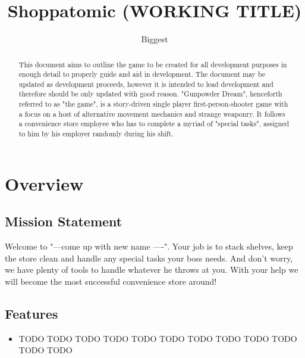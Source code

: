 \documentclass[10pt,a4paper]{article}
\author{Biggest}
\title{Shoppatomic (WORKING TITLE)}
\begin{document}
\maketitle
\newpage
\tableofcontents
\newpage

\begin{abstract}
This document aims to outline the game to be created for all development purposes in enough detail to properly guide and aid in development. The document may be updated as development proceeds, however it is intended to lead development and therefore should be only updated with good reason. "Gunpowder Dream", henceforth referred to as "the game", is a story-driven single player first-person-shooter game with a focus on a host of alternative movement mechanics and strange weaponry. It follows a convenience store employee who has to complete a myriad of "special tasks", assigned to him by his employer randomly during his shift. 
\end{abstract}
\newpage




\section{Overview}
\subsection{Mission Statement}
Welcome to "---come up with new name ----". Your job is to stack shelves, keep the store clean and handle any special tasks your boss needs. And don't worry, we have plenty of tools to handle whatever he throws at you. With your help we will become the most successful convenience store around! 
\subsection{Features}
\begin{itemize}
 \item TODO TODO TODO TODO TODO TODO TODO TODO TODO TODO TODO TODO 
\end{itemize}
\end{document}
